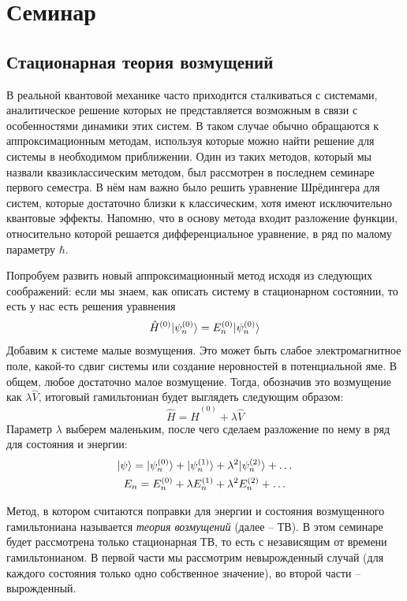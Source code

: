 \section{Семинар \thesection}

\subsection{Стационарная теория возмущений}

В реальной квантовой механике часто приходится сталкиваться с системами,
аналитическое решение которых не представляется возможным в связи с
особенностями динамики этих систем. В таком случае обычно обращаются к
аппроксимационным методам, используя которые можно найти решение для системы в
необходимом приближении. Один из таких методов, который мы назвали
квазиклассическим методом, был рассмотрен в последнем семинаре первого
семестра. В нём нам важно было решить уравнение Шрёдингера для систем, которые
достаточно близки к классическим, хотя имеют исключительно квантовые эффекты.
Напомню, что в основу метода входит разложение функции, относительно которой
решается дифференциальное уравнение, в ряд по малому параметру $\hbar$.

Попробуем развить новый аппроксимационный метод исходя из следующих
соображений: если мы знаем, как описать систему в стационарном состоянии, то
есть у нас есть решения уравнения
\[
  \hat{H}^{(0)}\lvert\psi^{(0)}_n\rangle = E^{(0)}_n\lvert\psi^{(0)}_n\rangle
\]
Добавим к системе малые возмущения. Это может быть слабое электромагнитное
поле, какой-то сдвиг системы или создание неровностей в потенциальной яме. В
общем, любое достаточно малое возмущение. Тогда, обозначив это возмущение как
$\lambda \hat{V}$, итоговый гамильтониан будет выглядеть следующим образом:
\[
  \hat{H} = \hat{H}^{(0)} + \lambda\hat{V}
\]
Параметр $\lambda$ выберем маленьким, после чего сделаем разложение по нему в
ряд для состояния и энергии:
\begin{gather*}
  \lvert\psi\rangle = \lvert\psi^{(0)}_n\rangle + \lvert\psi^{(1)}_n\rangle + \lambda^2\lvert\psi^{(2)}_n\rangle+ \dots\\
  E_n = E^{(0)}_n + \lambda E^{(1)}_n + \lambda^2 E^{(2)}_n + \dots
\end{gather*}

Метод, в котором считаются поправки для энергии и состояния возмущенного
гамильтониана называется \textit{теория возмущений} (далее – ТВ). В этом
семинаре будет рассмотрена только стационарная ТВ, то есть с независящим от
времени гамильтонианом. В первой части мы рассмотрим невырожденный случай (для
каждого состояния только одно собственное значение), во второй части --
вырожденный.

